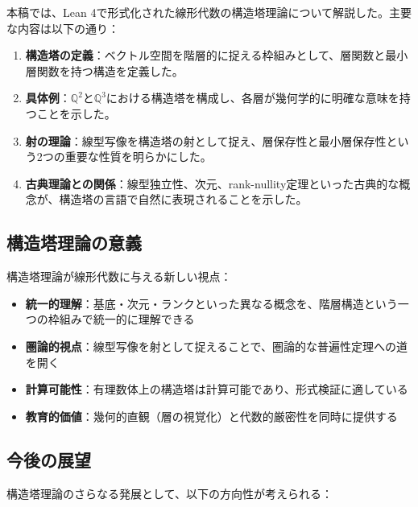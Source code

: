 \documentclass[11pt,a4paper]{ltjsarticle}
\theoremstyle{definition}
\newcommand{\Q}{\mathbb{Q}}
\begin{document}
本稿では、Lean 4で形式化された線形代数の構造塔理論について解説した。主要な内容は以下の通り：

\begin{enumerate}
\item \textbf{構造塔の定義}：ベクトル空間を階層的に捉える枠組みとして、層関数と最小層関数を持つ構造を定義した。

\item \textbf{具体例}：$\Q^2$と$\Q^3$における構造塔を構成し、各層が幾何学的に明確な意味を持つことを示した。

\item \textbf{射の理論}：線型写像を構造塔の射として捉え、層保存性と最小層保存性という2つの重要な性質を明らかにした。

\item \textbf{古典理論との関係}：線型独立性、次元、rank-nullity定理といった古典的な概念が、構造塔の言語で自然に表現されることを示した。
\end{enumerate}

\subsection{構造塔理論の意義}

構造塔理論が線形代数に与える新しい視点：
\begin{itemize}
\item \textbf{統一的理解}：基底・次元・ランクといった異なる概念を、階層構造という一つの枠組みで統一的に理解できる
\item \textbf{圏論的視点}：線型写像を射として捉えることで、圏論的な普遍性定理への道を開く
\item \textbf{計算可能性}：有理数体上の構造塔は計算可能であり、形式検証に適している
\item \textbf{教育的価値}：幾何的直観（層の視覚化）と代数的厳密性を同時に提供する
\end{itemize}

\subsection{今後の展望}

構造塔理論のさらなる発展として、以下の方向性が考えられる：
\end{document}
